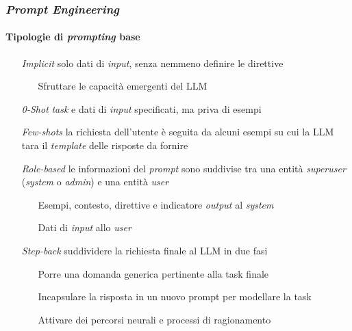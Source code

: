 %
\begin{frame}[t] \frametitle{\emph{Prompt Engineering}}
\framesubtitle{Tipologie di \emph{prompting} base}
{\footnotesize
    \begin{minipage}[t]{\textwidth}
        \begin{itemize}[leftmargin=50pt,align=right]
            \item[\alert{\emph{Implicit}}] solo dati di \emph{input}, senza nemmeno definire le direttive
            \begin{itemize}[leftmargin=15pt,align=right]
                \item[\alert{\faArrowCircleRight}] Sfruttare le capacità emergenti del LLM
            \end{itemize}
            \item[\alert{\emph{0-Shot}}] \emph{task} e dati di \textit{input} specificati, ma priva di esempi
            \item[\alert{\emph{Few-shots}}] la richiesta dell'utente è seguita da alcuni esempi su cui la LLM tara il \emph{template} delle risposte da fornire
            \item[\alert{\emph{Role-based}}] le informazioni del \emph{prompt} sono suddivise tra una entità \emph{superuser} (\emph{system} o \emph{admin}) e una entità \emph{user}
            \begin{itemize}[leftmargin=15pt,align=right]
                \item[\alert{\faArrowCircleRight}] Esempi, contesto, direttive e indicatore \emph{output} al \emph{system}
                \item[\alert{\faArrowCircleRight}] Dati di \emph{input} allo \emph{user}
            \end{itemize}
            \item[\alert{\emph{Step-back}}] suddividere la richiesta finale al LLM in due fasi
            \begin{itemize}[leftmargin=15pt,align=right]
                \item[\alert{\faArrowCircleRight}] Porre una domanda generica pertinente alla task finale
                \item[\alert{\faArrowCircleRight}] Incapsulare la risposta in un nuovo prompt per modellare la task
                \item[\alert{\faExclamationTriangle}] Attivare dei \alert{percorsi neurali} e \alert{processi di ragionamento}

\end{itemize}
\end{itemize}
\end{minipage}}
\end{frame}

